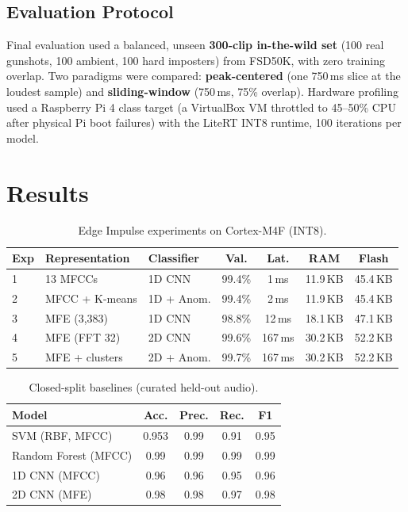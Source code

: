 \documentclass[conference]{IEEEtran}
\begin{document}
\subsection{Evaluation Protocol}
Final evaluation used a balanced, unseen \textbf{300-clip in-the-wild set} (100 real gunshots, 100 ambient,
100 hard imposters) from FSD50K, with zero training overlap. Two paradigms were compared: \textbf{peak-centered}
(one 750\,ms slice at the loudest sample) and \textbf{sliding-window} (750\,ms, 75\% overlap). Hardware
profiling used a Raspberry Pi 4 class target (a VirtualBox VM throttled to 45--50\% CPU after physical Pi boot
failures) with the LiteRT INT8 runtime, 100 iterations per model.

\section{Results}
\label{sec:results}

\begin{table}[t]
\centering
\caption{Edge Impulse experiments on Cortex-M4F (INT8).}
\label{tab:ei}
\small
\begin{tabular}{p{0.6cm}p{2.4cm}p{1.5cm}c c c c}
\toprule
\textbf{Exp} & \textbf{Representation} & \textbf{Classifier} & \textbf{Val.} & \textbf{Lat.} & \textbf{RAM} & \textbf{Flash} \\
\midrule
1 & 13 MFCCs & 1D CNN & 99.4\% & 1\,ms & 11.9\,KB & 45.4\,KB \\
2 & MFCC + K-means & 1D + Anom. & 99.4\% & 2\,ms & 11.9\,KB & 45.4\,KB \\
3 & MFE (3{,}383) & 1D CNN & 98.8\% & 12\,ms & 18.1\,KB & 47.1\,KB \\
4 & MFE (FFT 32) & 2D CNN & 99.6\% & 167\,ms & 30.2\,KB & 52.2\,KB \\
5 & MFE + clusters & 2D + Anom. & 99.7\% & 167\,ms & 30.2\,KB & 52.2\,KB \\
\bottomrule
\end{tabular}
\end{table}

\begin{table}[t]
\centering
\caption{Closed-split baselines (curated held-out audio).}
\label{tab:closed}
\small
\begin{tabular}{lcccc}
\toprule
\textbf{Model} & \textbf{Acc.} & \textbf{Prec.} & \textbf{Rec.} & \textbf{F1} \\
\midrule
SVM (RBF, MFCC) & 0.953 & 0.99 & 0.91 & 0.95 \\
Random Forest (MFCC) & 0.99 & 0.99 & 0.99 & 0.99 \\
1D CNN (MFCC) & 0.96 & 0.96 & 0.95 & 0.96 \\
2D CNN (MFE) & 0.98 & 0.98 & 0.97 & 0.98 \\
\bottomrule
\end{tabular}
\end{table}
\end{document}
